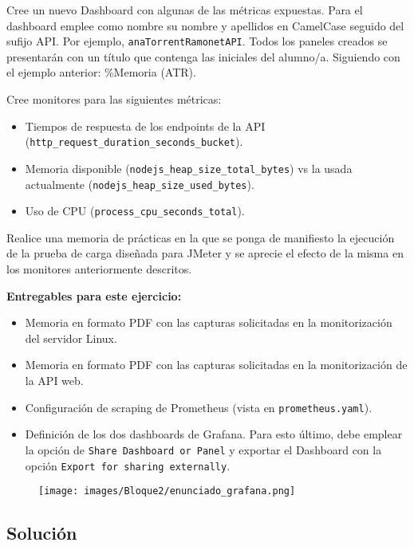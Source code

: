Cree un nuevo Dashboard con algunas de las métricas expuestas. Para el dashboard emplee como nombre su nombre y apellidos en CamelCase seguido del sufijo API. Por ejemplo, \texttt{anaTorrentRamonetAPI}. Todos los paneles creados se presentarán con un título que contenga las iniciales del alumno/a. Siguiendo con el ejemplo anterior: \%Memoria (ATR).

Cree monitores para las siguientes métricas:
\begin{itemize}
    \item Tiempos de respuesta de los endpoints de la API (\texttt{http\_request\_duration\_seconds\_bucket}).
    \item Memoria disponible (\texttt{nodejs\_heap\_size\_total\_bytes}) vs la usada actualmente (\texttt{nodejs\_heap\_size\_used\_bytes}).
    \item Uso de CPU (\texttt{process\_cpu\_seconds\_total}).
\end{itemize}

Realice una memoria de prácticas en la que se ponga de manifiesto la ejecución de la prueba de carga diseñada para JMeter y se aprecie el efecto de la misma en los monitores anteriormente descritos.

\textbf{Entregables para este ejercicio:}
\begin{itemize}
    \item Memoria en formato PDF con las capturas solicitadas en la monitorización del servidor Linux.
    \item Memoria en formato PDF con las capturas solicitadas en la monitorización de la API web.
    \item Configuración de scraping de Prometheus (vista en \texttt{prometheus.yaml}).
    \item Definición de los dos dashboards de Grafana. Para esto último, debe emplear la opción de \texttt{Share Dashboard or Panel} y exportar el Dashboard con la opción \texttt{Export for sharing externally}.
\end{itemize}

\begin{figure}[H]
    \centering
    \texttt{[image: images/Bloque2/enunciado\_grafana.png]}
    \label{fig:grafana}
\end{figure}

\subsection*{Solución}


